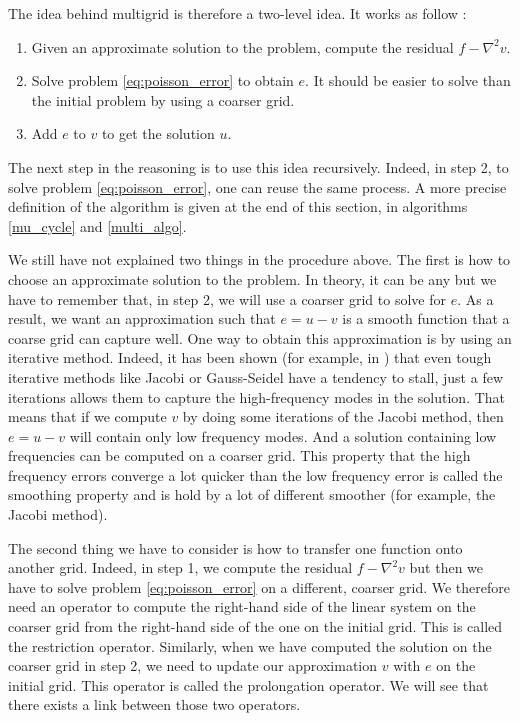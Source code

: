 The idea behind multigrid is therefore a two-level idea. It works as follow : 

\begin{enumerate}
\item Given an approximate solution to the problem, compute the residual $f-\nabla^2v$.
\item Solve problem \ref{eq:poisson_error} to obtain $e$. It should be easier to solve than the initial problem by using a coarser grid.
\item Add $e$ to $v$ to get the solution $u$. 
\end{enumerate}

The next step in the reasoning is to use this idea recursively. Indeed, in step 2, to solve problem \ref{eq:poisson_error}, one can reuse the same process. A more precise definition of the algorithm is given at the end of this section, in algorithms  \ref{mu_cycle} and \ref{multi_algo}.

We still have not explained two things in the procedure above. The first is how to choose an approximate solution to the problem. In theory, it can be any but we have to remember that, in step 2, we will use a coarser grid to solve for $e$. As a result, we want an approximation such that $e = u-v$ is a smooth function that a coarse grid can capture well. One way to obtain this approximation is by using an iterative method. Indeed, it has been shown (for example, in \cite{smoothing}) that even tough iterative methods like Jacobi or Gauss-Seidel have a tendency to stall, just a few iterations allows them to capture the high-frequency modes in the solution. That means that if we compute $v$ by doing some iterations of the Jacobi method, then $e = u-v$ will contain only low frequency modes. And a solution containing low frequencies can be computed on a coarser grid. This property that the high frequency errors converge a lot quicker than the low frequency error is called the smoothing property and is hold by a lot of different smoother (for example, the Jacobi method).

The second thing we have to consider is how to transfer one function onto another grid. Indeed, in step 1, we compute the residual $f-\nabla^2 v$ but then we have to solve problem \ref{eq:poisson_error} on a different, coarser grid. We therefore need an operator to compute the right-hand side of the linear system on the coarser grid from the right-hand side of the one on the initial grid. This is called the restriction operator. Similarly, when we have computed the solution on the coarser grid in step 2, we need to update our approximation $v$ with $e$ on the initial grid. This operator is called the prolongation operator. We will see that there exists a link between those two operators.


